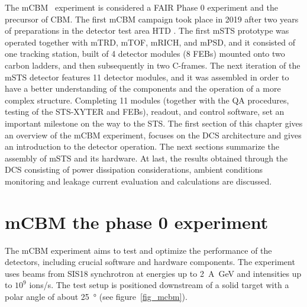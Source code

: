 The mCBM~\cite{mCBM} experiment is considered a \gls{FAIR} Phase \num{0} experiment and the precursor of \gls{CBM}. The first mCBM campaign took place in \num{2019} after two years of preparations in the detector test area HTD \cite{progress_report_2017_sturm}. The first \gls{mSTS} prototype was operated together with mTRD, mTOF, mRICH, and mPSD, and it consisted of one tracking station, built of \num{4} detector modules (\num{8} \glspl{FEB}) mounted onto two carbon ladders, and then subsequently in two C-frames. The next iteration of the \gls{mSTS} detector features \num{11} detector modules, and it was assembled in order to have a better understanding of the components and the operation of a more complex structure. Completing \num{11} modules (together with the QA procedures, testing of the STS-XYTER and \glspl{FEB}), readout, and control software, set an important milestone on the way to the \gls{STS}. The first section of this chapter gives an overview of the \gls{mCBM} experiment, focuses on the \gls{DCS} architecture and gives an introduction to the detector operation. The next sections summarize the assembly of \gls{mSTS} and its hardware. At last, the results obtained through the \gls{DCS} consisting of power dissipation considerations, ambient conditions monitoring and leakage current evaluation and calculations are discussed.

\section{mCBM the phase 0 experiment}
The \gls{mCBM} experiment aims to test and optimize the performance of the detectors, including crucial software and hardware components. The experiment uses beams from SIS18 synchrotron at energies up to \SI{2}{\A\giga\eV} and intensities up to $10^{9}$ ions/s. The test setup is positioned downstream of a solid target with a polar angle of about \SI{25}{\degree} (see figure~\ref{fig_mcbm}).

